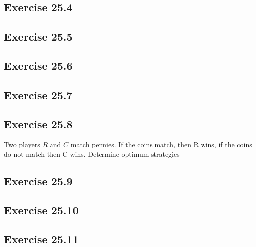 \documentclass[]{report}
\begin{document}
\subsection{Exercise 25.4}
\subsection{Exercise 25.5}
\subsection{Exercise 25.6}
\subsection{Exercise 25.7}
\subsection{Exercise 25.8}
Two players $R$ and $C$ match pennies. If the coins match, then R wins, if the coins
do not match then C wins. Determine optimum strategies
\subsection{Exercise 25.9}
\subsection{Exercise 25.10}
\subsection{Exercise 25.11}
\end{document}
